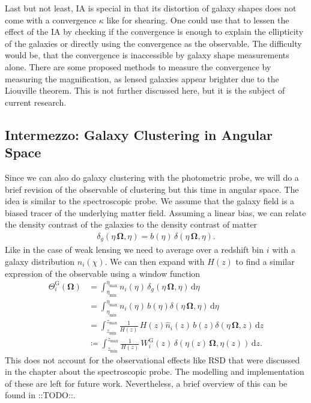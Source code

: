 \documentclass[oneside]{book}
\newcommand*{\rd}{\mathrm{d}}
\newcommand*{\marktodo}{{\color{mmcol} ::TODO::}\xspace}
\begin{document}
Last but not least, IA is special in that its distortion of galaxy shapes does not come with a convergence $\kappa$ like for shearing. One could use that to lessen the effect of the IA by checking if the convergence is enough to explain the ellipticity of the galaxies or directly using the convergence as the observable. The difficulty would be, that the convergence is inaccessible by galaxy shape measurements alone. There are some proposed methods to measure the convergence by measuring the magnification, as lensed galaxies appear brighter due to the Liouville theorem. This is not further discussed here, but it is the subject of current research.

\subsection*{ Intermezzo: Galaxy Clustering in Angular Space}
Since we can also do galaxy clustering with the photometric probe, we will do a brief revision of the observable of clustering but this time in angular space. The idea is similar to the spectroscopic probe. We assume that the galaxy field is a biased tracer of the underlying matter field. Assuming a linear bias, we can relate the density contrast of the galaxies to the density contrast of matter \begin{align*}
    \delta_g(\eta\,\boldsymbol{\Omega},\eta) = b(\eta)\,\delta(\eta\,\boldsymbol{\Omega},\eta).
\end{align*}
Like in the case of weak lensing we need to average over a redshift bin $i$ with a galaxy distribution $n_i(\chi)$. We can then expand with $H(z)$ to find a similar expression of the observable using a window function \begin{align}
    \varTheta^\mathrm{G}_i(\boldsymbol{\Omega}) &= \int_{\eta_\mathrm{min}}^{\eta_\mathrm{max}} n_i(\eta) \, \delta_g(\eta\,\boldsymbol{\Omega},\eta) \,\rd \eta \\
    &= \int_{\eta_\mathrm{min}}^{\eta_\mathrm{max}} n_i(\eta) \, b(\eta) \delta(\eta\,\boldsymbol{\Omega},\eta) \,\rd \eta \nonumber \\
    &=  \int_{z_\mathrm{min}}^{z_\mathrm{max}} \frac{1}{H(z)}\,H(z)\hat{n}_i(z) \, b(z) \delta(\eta\,\boldsymbol{\Omega},z) \,\rd z \nonumber \\
    &\coloneqq \int_{z_\mathrm{min}}^{z_\mathrm{max}} \frac{1}{H(z)} \, W^\mathrm{G}_i(z) \, \delta(\eta(z)\,\boldsymbol{\Omega},\eta(z)) \,\rd z.
\end{align}
This does not account for the observational effects like RSD that were discussed in the chapter about the spectroscopic probe. The modelling and implementation of these are left for future work. Nevertheless, a brief overview of this can be found in \marktodo.\\
\end{document}
